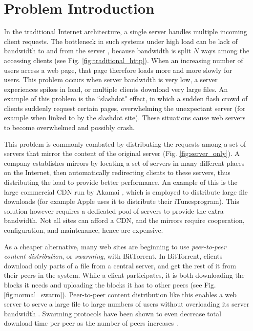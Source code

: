 \section {Problem Introduction}
In the traditional Internet architecture, a single server handles multiple incoming client requests.  The bottleneck in such systems under high load can be lack of bandwidth to and from the server \cite{coopnet}, because bandwidth is split $N$ ways among the accessing clients (see Fig. \ref{fig:traditional_http}).  When an increasing number of users access a web page, that page therefore loads more and more slowly for users.  This problem occurs when server bandwidth is very low, a server experiences spikes in load, or multiple clients download very large files.  An example of this problem is the ``slashdot" effect, in which a sudden flash crowd of clients suddenly request certain pages, overwhelming the unexpectant server (for example when linked to by the slashdot site).  These situations cause web servers to become overwhelmed and possibly crash.

This problem is commonly combated by distributing the requests among a set of servers that mirror the content of the original server (Fig. \ref{fig:server_only}).  A company establishes mirrors by locating a set of servers in many different places on the Internet, then automatically redirecting clients to these servers, thus distributing the load to provide better performance.  An example of this is the large commercial CDN run by Akamai \cite{akamai}, which is employed to distribute large file downloads (for example Apple uses it to distribute their iTunes\texttrademark  program).  This solution however requires a dedicated pool of servers to provide the extra bandwidth.  Not all sites can afford a CDN, and the mirrors require cooperation, configuration, and maintenance, hence are expensive.

As a cheaper alternative, many web sites are beginning to use \emph{peer-to-peer content distribution}, or \emph{swarming}, with BitTorrent.  In BitTorrent, clients download only parts of a file from a central server, and get the rest of it from their peers in the system.  While a client participates, it is both downloading the blocks it needs and uploading the blocks it has to other peers (see Fig. \ref{fig:normal_swarm}).  Peer-to-peer content distribution like this enables a web server to serve a large file to large numbers of users without overloading its server bandwidth \cite{zappala}. Swarming protocols have been shown to even decrease total download time per peer as the number of peers increases \cite{slurpie}. 

